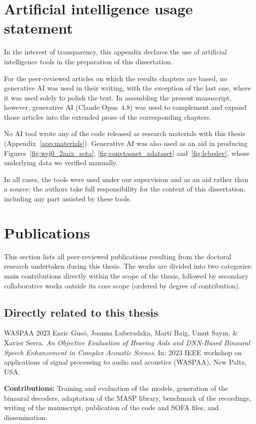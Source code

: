 \chapter{Artificial intelligence usage statement}
\label{app:ai}

In the interest of transparency, this appendix declares the use of artificial
intelligence tools in the preparation of this dissertation.

For the peer-reviewed articles on which the results chapters are based, no
generative AI was used in their writing, with the exception of the
last one, where it was used solely to polish the text. In assembling the present
manuscript, however, generative AI (Claude Opus~4.8) was used to
complement and expand those articles into the extended prose of the
corresponding chapters.

No AI tool wrote any of the code released as research materials with
this thesis (Appendix~\ref{app:materials}). Generative AI was also
used as an aid in producing Figures~\ref{fig:wsj0_2mix_sota},
\ref{fig:convtasnet_xdataset} and~\ref{fig:lebedev}, whose underlying data we
verified manually.

In all cases, the tools were used under our supervision and as an aid rather
than a source: the authors take full responsibility for the content of this
dissertation, including any part assisted by these tools.

\chapter{Publications}
\label{sec:pubs}

This section lists all peer-reviewed publications resulting from the doctoral research undertaken during this thesis. The works are divided into two categories: main contributions directly within the scope of the thesis, followed by secondary collaborative works outside its core scope (ordered by degree of contribution).

\section{Directly related to this thesis}
\label{sec:pubs_first_author}

\begin{mybox}{WASPAA 2023}
    Enric Gusó, Joanna Luberadzka, Martí Baig, Umut Say\i n, \& Xavier Serra.
    \emph{An Objective Evaluation of Hearing Aids and DNN-Based Binaural Speech Enhancement in Complex Acoustic Scenes}.
    In: 2023 IEEE workshop on applications of signal processing to audio and acoustics (WASPAA), New Paltz, USA. 
\end{mybox}
\textbf{Contributions:} Training and evaluation of the models, generation of the binaural decoders, adaptation of the \acrshort{MASP} library, benchmark of the  recordings, writing of the manuscript, publication of the code and \acrshort{SOFA} files, and dissemination.

